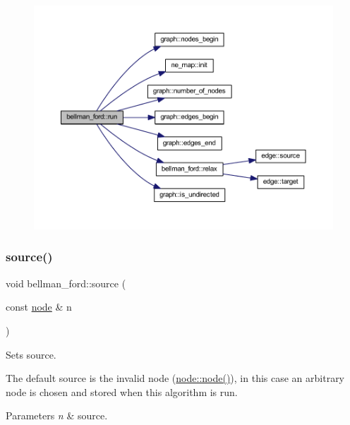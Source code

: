 \begin{figure}[H]
\begin{center}
\leavevmode
\includegraphics[width=350pt]{classbellman__ford_a226308389f3c36dfc02768c09f777a3b_cgraph}
\end{center}
\end{figure}
\mbox{\label{classbellman__ford_a98cad540fd2d211c1ba44bb6fa8416f3}} 
\subsubsection{\texorpdfstring{source()}{source()}\hspace{0.1cm}{\footnotesize\ttfamily [1/2]}}
{\footnotesize\ttfamily void bellman\+\_\+ford\+::source (\begin{DoxyParamCaption}\item[{const \mbox{\hyperlink{classnode}{node}} \&}]{n }\end{DoxyParamCaption})\hspace{0.3cm}{\ttfamily [inline]}}



Sets source. 

The default source is the invalid node (\mbox{\hyperlink{classnode_a6da4ea35f222059db9a59cf40be459f9}{node\+::node()}}), in this case an arbitrary node is chosen and stored when this algorithm is run.


\begin{DoxyParams}{Parameters}
{\em n} & source. \\
\hline
\end{DoxyParams}


